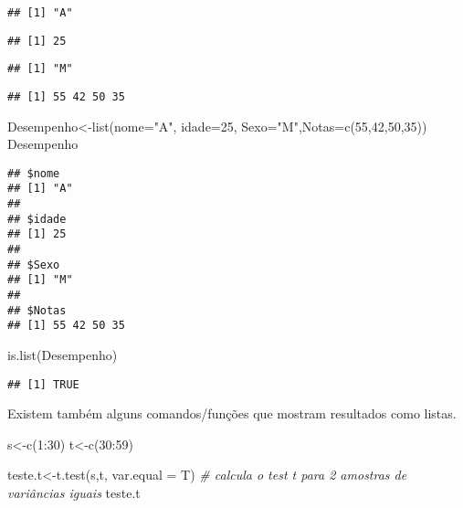 \documentclass[
]{book}
\newenvironment{Shaded}{\begin{snugshade}}{\end{snugshade}}
\newcommand{\AttributeTok}[1]{\textcolor[rgb]{0.77,0.63,0.00}{#1}}
\newcommand{\CommentTok}[1]{\textcolor[rgb]{0.56,0.35,0.01}{\textit{#1}}}
\newcommand{\DecValTok}[1]{\textcolor[rgb]{0.00,0.00,0.81}{#1}}
\newcommand{\FunctionTok}[1]{\textcolor[rgb]{0.00,0.00,0.00}{#1}}
\newcommand{\NormalTok}[1]{#1}
\newcommand{\OtherTok}[1]{\textcolor[rgb]{0.56,0.35,0.01}{#1}}
\newcommand{\SpecialCharTok}[1]{\textcolor[rgb]{0.00,0.00,0.00}{#1}}
\newcommand{\StringTok}[1]{\textcolor[rgb]{0.31,0.60,0.02}{#1}}
\begin{document}
\begin{verbatim}
## [1] "A"
\end{verbatim}

\begin{verbatim}
## [1] 25
\end{verbatim}

\begin{verbatim}
## [1] "M"
\end{verbatim}

\begin{verbatim}
## [1] 55 42 50 35
\end{verbatim}

\begin{Shaded}
\begin{Highlighting}[]
\NormalTok{Desempenho}\OtherTok{\textless{}{-}}\FunctionTok{list}\NormalTok{(}\AttributeTok{nome=}\StringTok{"A"}\NormalTok{, }\AttributeTok{idade=}\DecValTok{25}\NormalTok{, }\AttributeTok{Sexo=}\StringTok{"M"}\NormalTok{,}\AttributeTok{Notas=}\FunctionTok{c}\NormalTok{(}\DecValTok{55}\NormalTok{,}\DecValTok{42}\NormalTok{,}\DecValTok{50}\NormalTok{,}\DecValTok{35}\NormalTok{))}
\NormalTok{Desempenho}
\end{Highlighting}
\end{Shaded}

\begin{verbatim}
## $nome
## [1] "A"
## 
## $idade
## [1] 25
## 
## $Sexo
## [1] "M"
## 
## $Notas
## [1] 55 42 50 35
\end{verbatim}

\begin{Shaded}
\begin{Highlighting}[]
\FunctionTok{is.list}\NormalTok{(Desempenho)}
\end{Highlighting}
\end{Shaded}

\begin{verbatim}
## [1] TRUE
\end{verbatim}

Existem também alguns comandos/funções que mostram resultados como listas.

\begin{Shaded}
\begin{Highlighting}[]
\NormalTok{s}\OtherTok{\textless{}{-}}\FunctionTok{c}\NormalTok{(}\DecValTok{1}\SpecialCharTok{:}\DecValTok{30}\NormalTok{)}
\NormalTok{t}\OtherTok{\textless{}{-}}\FunctionTok{c}\NormalTok{(}\DecValTok{30}\SpecialCharTok{:}\DecValTok{59}\NormalTok{)}

\NormalTok{teste.t}\OtherTok{\textless{}{-}}\FunctionTok{t.test}\NormalTok{(s,t, }\AttributeTok{var.equal =}\NormalTok{ T) }\CommentTok{\# calcula o test t para 2 amostras de variâncias iguais}
\NormalTok{teste.t}
\end{Highlighting}
\end{Shaded}
\end{document}
